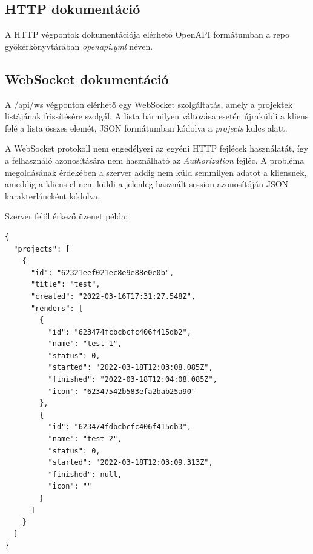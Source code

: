 \subsection{HTTP dokumentáció}
A HTTP végpontok dokumentációja elérhető OpenAPI formátumban a repo gyökérkönyvtárában \emph{openapi.yml} néven.

\subsection{WebSocket dokumentáció}
A /api/ws végponton elérhető egy WebSocket szolgáltatás, amely a projektek listájának frissítésére szolgál. A lista bármilyen változása esetén újraküldi a kliens felé a lista összes elemét, JSON formátumban kódolva a \emph{projects} kulcs alatt.

A WebSocket protokoll nem engedélyezi az egyéni HTTP fejlécek használatát, így a felhasználó azonosítására nem használható az \emph{Authorization} fejléc. A probléma megoldásának érdekében a szerver addig nem küld semmilyen adatot a kliensnek, ameddig a kliens el nem küldi a jelenleg használt session azonosítóján JSON karakterláncként kódolva.

\pagebreak

Szerver felől érkező üzenet példa:
\begin{lstlisting}
{
  "projects": [
    {
      "id": "62321eef021ec8e9e88e0e0b",
      "title": "test",
      "created": "2022-03-16T17:31:27.548Z",
      "renders": [
        {
          "id": "623474fcbcbcfc406f415db2",
          "name": "test-1",
          "status": 0,
          "started": "2022-03-18T12:03:08.085Z",
          "finished": "2022-03-18T12:04:08.085Z",
          "icon": "62347542b583efa2bab25a90"
        },
        {
          "id": "623474fdbcbcfc406f415db3",
          "name": "test-2",
          "status": 0,
          "started": "2022-03-18T12:03:09.313Z",
          "finished": null,
          "icon": ""
        }
      ]
    }
  ]
}
\end{lstlisting}